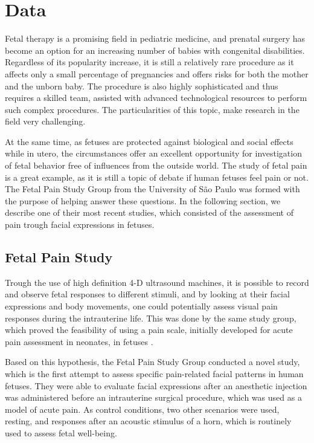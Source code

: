 \chapter{Data}

Fetal therapy is a promising field in pediatric medicine, and prenatal surgery has become an option for an increasing number of babies with congenital disabilities. Regardless of its popularity increase, it is still a relatively rare procedure as it affects only a small percentage of pregnancies and offers risks for both the mother and the unborn baby. The procedure is also highly sophisticated and thus requires a skilled team, assisted with advanced technological resources to perform such complex procedures. The particularities of this topic, make research in the field very challenging.

At the same time, as fetuses are protected against biological and social effects while in utero, the circumstances offer an excellent opportunity for investigation of fetal behavior free of influences from the outside world. The study of fetal pain is a great example, as it is still a topic of debate if human fetuses feel pain or not. The Fetal Pain Study Group from the University of São Paulo was formed with the purpose of helping answer these questions. In the following section, we describe one of their most recent studies, which consisted of the assessment of pain trough facial expressions in fetuses.

\section{Fetal Pain Study}

Trough the use of high definition 4-D ultrasound machines, it is possible to record and observe fetal responses to different stimuli, and by looking at their facial expressions and body movements, one could potentially assess visual pain responses during the intrauterine life. This was done by the same study group, which proved the feasibility of using a pain scale, initially developed for acute pain assessment in neonates, in fetuses \citep{bernardes2018feasibility}. 

Based on this hypothesis, the Fetal Pain Study Group conducted a novel study, which is the first attempt to assess specific pain-related facial patterns in human fetuses. They were able to evaluate facial expressions after an anesthetic injection was administered before an intrauterine surgical procedure, which was used as a model of acute pain. As control conditions, two other scenarios were used, resting, and responses after an acoustic stimulus of a horn, which is routinely used to assess fetal well-being.

